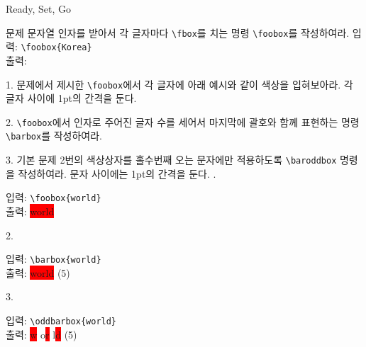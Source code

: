 \documentclass[a4paper,amsmath,itemph]{oblivoir}
\begin{document}
\begin{intro}[2]
Ready, Set, Go
\end{intro}

\begin{questiona}{문제}
문자열 인자를 받아서 각 글자마다 \verb|\fbox|를 치는 명령 \verb|\foobox|를 작성하여라.
\tcblower 
입력: \verb|\foobox{Korea}|\\
출력: 
\end{questiona}


\vfill

\begin{questionp}
 1. 문제에서 제시한 \verb|\foobox|에서 각 글자에 아래 예시와 같이 색상을 입혀보아라. 각 글자 사이에 1pt의 간격을 둔다.

\bigskip

 2. \verb|\foobox|에서 인자로 주어진 글자 수를 세어서 마지막에 괄호와 함께 표현하는 명령 \verb|\barbox|를 작성하여라.

\bigskip

 3. 기본 문제 2번의 색상상자를 홀수번째 오는 문자에만 적용하도록 \verb|\baroddbox| 명령을 작성하여라. 문자 사이에는 1pt의 간격을 둔다.
. \begin{minipage}[t]{\dimexpr\textwidth-3em\relax}
입력: \verb|\foobox{world}|\\
출력: \colorbox{red}{\color{yellow}w}\hskip1pt\colorbox{red}{\color{yellow}o}\hskip1pt\colorbox{red}{\color{yellow}r}\hskip1pt\colorbox{red}{\color{yellow}l}\hskip1pt\colorbox{red}{\color{yellow}d}
\end{minipage}

\smallskip

2. \begin{minipage}[t]{\dimexpr\textwidth-3em\relax}
입력: \verb|\barbox{world}| \\
출력: \colorbox{red}{\color{yellow}w}\hskip1pt\colorbox{red}{\color{yellow}o}\hskip1pt\colorbox{red}{\color{yellow}r}\hskip1pt\colorbox{red}{\color{yellow}l}\hskip1pt\colorbox{red}{\color{yellow}d} (5)
\end{minipage}

\smallskip

3. \begin{minipage}[t]{\dimexpr\textwidth-3em\relax}
입력: \verb|\oddbarbox{world}| \\
출력: \colorbox{red}{\color{yellow}w}\hskip1pt o\hskip1pt\colorbox{red}{\color{yellow}r}\hskip1pt l\hskip1pt\colorbox{red}{\color{yellow}d} (5)
\end{minipage}
\end{questionp}
\end{document}
